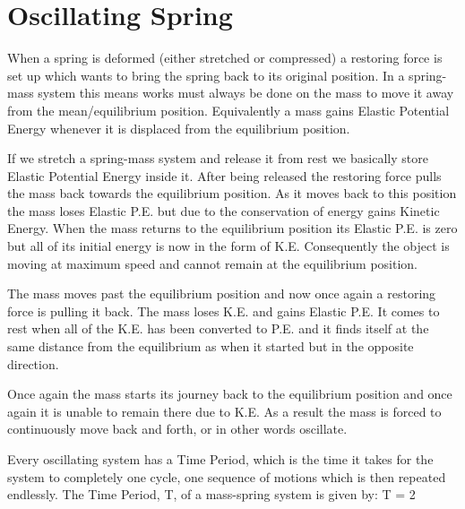 \section{Oscillating Spring}

    When a spring is deformed (either stretched or compressed) a restoring force is set up which wants to bring the spring back to its original position. In a spring-mass system this means works must always be done on the mass to move it away from the mean/equilibrium position. Equivalently a mass gains Elastic Potential Energy whenever it is displaced from the equilibrium position.

    If we stretch a spring-mass system and release it from rest we basically store Elastic Potential Energy inside it. After being released the restoring force pulls the mass back towards the equilibrium position. As it moves back to this position the mass loses Elastic P.E. but due to the conservation of energy gains Kinetic Energy. When the mass returns to the equilibrium position its Elastic P.E. is zero but all of its initial energy is now in the form of K.E. Consequently the object is moving at maximum speed and cannot remain at the equilibrium position.

    The mass moves past the equilibrium position and now once again a restoring force is pulling it back. The mass loses K.E. and gains Elastic P.E. It comes to rest when all of the K.E. has been converted to P.E. and it finds itself at the same distance from the equilibrium as when it started but in the opposite direction.

    Once again the mass starts its journey back to the equilibrium position and once again it is unable to remain there due to K.E. As a result the mass is forced to continuously move back and forth, or in other words oscillate.

    Every oscillating system has a Time Period, which is the time it takes for the system to completely one cycle, one sequence of motions which is then repeated endlessly. The Time Period, T, of a mass-spring system is given by:
    \beq
        T = 2 \pi {}
    \eeq
